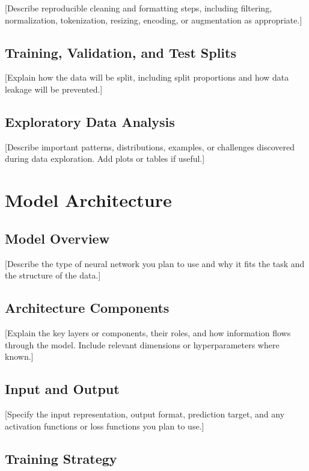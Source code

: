 \documentclass{article}
\begin{document}
[Describe reproducible cleaning and formatting steps, including
filtering, normalization, tokenization, resizing, encoding, or
augmentation as appropriate.]

\subsection{Training, Validation, and Test Splits}

[Explain how the data will be split, including split proportions
and how data leakage will be prevented.]

\subsection{Exploratory Data Analysis}

[Describe important patterns, distributions, examples, or challenges
discovered during data exploration. Add plots or tables if useful.]

\section{Model Architecture}

\subsection{Model Overview}

[Describe the type of neural network you plan to use and why it fits
the task and the structure of the data.]

\subsection{Architecture Components}

[Explain the key layers or components, their roles, and how information
flows through the model. Include relevant dimensions or hyperparameters
where known.]

\subsection{Input and Output}

[Specify the input representation, output format, prediction target,
and any activation functions or loss functions you plan to use.]

\subsection{Training Strategy}
\end{document}
